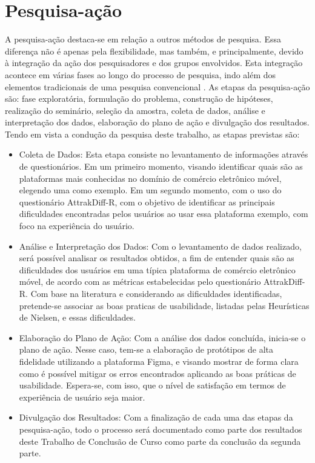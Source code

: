 
\section{Pesquisa-ação}
 \label{PesquisaAcao}

A pesquisa-ação destaca-se em relação a outros métodos de pesquisa. Essa diferença não é apenas pela flexibilidade, mas também, e principalmente, devido à integração da ação dos pesquisadores e dos grupos envolvidos. Esta integração acontece em várias fases ao longo do processo de pesquisa, indo além dos elementos tradicionais de uma pesquisa convencional \cite{ProjPesquisaGil}. As etapas da pesquisa-ação são: fase exploratória, formulação do problema, construção de hipóteses, realização do seminário, seleção da amostra, coleta de dados, análise e interpretação dos dados, elaboração do plano de ação e divulgação dos resultados. Tendo em vista a condução da pesquisa deste trabalho, as etapas previstas são:

\begin{itemize}
    \item Coleta de Dados: Esta etapa consiste no levantamento de informações através de questionários. Em um primeiro momento, visando identificar quais são as plataformas mais conhecidas no domínio de comércio eletrônico móvel, elegendo uma como exemplo. Em um segundo momento, com o uso do questionário AttrakDiff-R, com o objetivo de identificar as principais dificuldades encontradas pelos usuários ao usar essa plataforma exemplo, com foco na experiência do usuário.
    \item Análise e Interpretação dos Dados: Com o levantamento de dados realizado, será possível analisar os resultados obtidos, a fim de entender quais são as dificuldades dos usuários em uma típica plataforma de comércio eletrônico móvel, de acordo com as métricas estabelecidas pelo questionário AttrakDiff-R. Com base na literatura e considerando as dificuldades identificadas, pretende-se associar as boas praticas de usabilidade, listadas pelas Heurísticas de Nielsen, e essas dificuldades.
    \item Elaboração do Plano de Ação: Com a análise dos dados concluída, inicia-se o plano de ação. Nesse caso, tem-se a elaboração de protótipos de alta fidelidade utilizando a plataforma Figma, e visando mostrar de forma clara como é possível mitigar os erros encontrados aplicando as boas práticas de usabilidade. Espera-se, com isso, que o nível de satisfação em termos de experiência de usuário seja maior.
    \item Divulgação dos Resultados: Com a finalização de cada uma das etapas da pesquisa-ação, todo o processo será documentado como parte dos resultados deste Trabalho de Conclusão de Curso como parte da conclusão da segunda parte.
\end{itemize}

